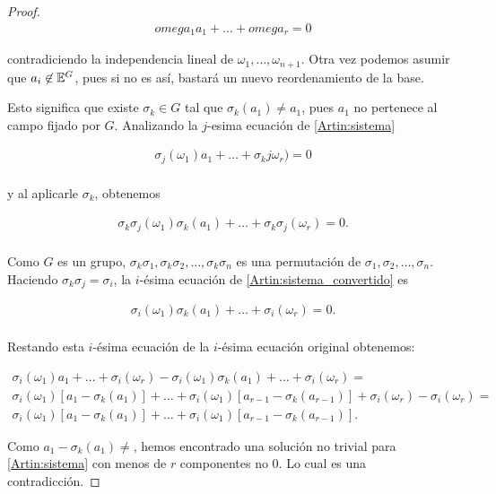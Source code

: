 \begin{proof}
    \begin{align}
        omega_1 a_1   +   \dots + omega_r  =   0
    \end{align}
    
    contradiciendo la independencia lineal de $\omega_1, \dots, \omega_{n+1}$. Otra vez podemos asumir que $a_i \not\in \mathbb{E}^G$,
    pues si no es así, bastará un nuevo reordenamiento de la base.\par\null
    
    Esto significa que existe $\sigma_k \in G$ tal que $\sigma_k(a_1) \not= a_1$, pues $a_1$ no pertenece al campo fijado por $G$.
    Analizando la $j$-esima ecuación de \eqref{Artin:sistema}
    
    \begin{align}
        \sigma_j(\omega_1)a_1   +   \dots   +   \sigma_kj\omega_{r})   =   0                                    \\
    \end{align}
    
    y al aplicarle $\sigma_k$, obtenemos
        
    \begin{align} \label{Artin:sistema_convertido}
        \sigma_k\sigma_j(\omega_1)\sigma_k(a_1)   +   \dots   +   \sigma_k\sigma_j(\omega_{r})   =   0.         \\
    \end{align}\par\null
    
    Como $G$ es un grupo, $\sigma_k\sigma_1, \sigma_k\sigma_2, \dots, \sigma_k\sigma_n$ es una permutación de
    $\sigma_1, \sigma_2, \dots, \sigma_n$. Haciendo $\sigma_k \sigma_j = \sigma_i$, la $i$-ésima ecuación de \eqref{Artin:sistema_convertido}
    es
    
    \begin{align}
        \sigma_i(\omega_1)\sigma_k(a_1)   +   \dots   +   \sigma_i(\omega_{r})   =   0.                         \\
    \end{align}
    
    Restando esta $i$-ésima ecuación de la $i$-ésima ecuación original obtenemos:
    
    \begin{align}
        \sigma_i(\omega_1) a_1   +   \dots   +   \sigma_i(\omega_{r}) - \sigma_i(\omega_1)\sigma_k(a_1)   +   \dots   +   \sigma_i(\omega_{r})                  =\\
        \sigma_i(\omega_1) [a_1 - \sigma_k(a_1)]   +   \dots   +  \sigma_i(\omega_1) [a_{r-1} - \sigma_k(a_{r-1})] + \sigma_i(\omega_{r}) - \sigma_i(\omega_{r})=\\
        \sigma_i(\omega_1) [a_1 - \sigma_k(a_1)]   +   \dots   +  \sigma_i(\omega_1) [a_{r-1} - \sigma_k(a_{r-1})].  
    \end{align}
    
    Como $a_1 - \sigma_k(a_1) \not=$, hemos encontrado una solución no trivial para \eqref{Artin:sistema} con menos de $r$ componentes no $0$. Lo cual
    es una contradicción.
\end{proof}